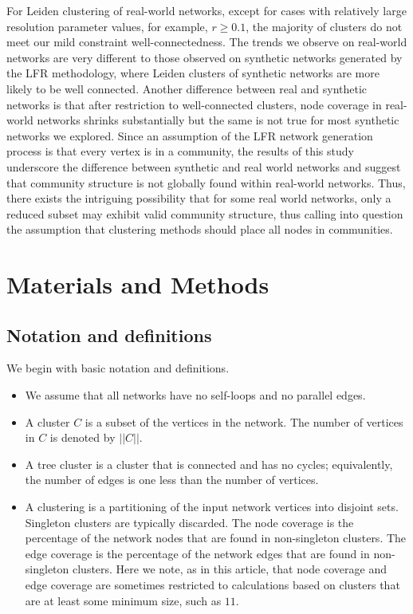 \documentclass[11pt]{article}   	%
\begin{document}
For Leiden clustering of real-world networks, except for cases with relatively large resolution parameter values, for example, $r \geq 0.1$, the majority of clusters do not meet our mild constraint well-connectedness.
The trends we observe on real-world networks are very different to those observed on synthetic networks   generated by the LFR methodology, where Leiden clusters of
synthetic networks are more likely to be well connected. 
Another difference between real and synthetic networks is that after restriction to well-connected clusters, node coverage in real-world networks shrinks substantially but the same is not true for most synthetic networks we explored.  Since an assumption of the LFR network generation process  is that every vertex  is in a community, the results of this study
underscore the difference between synthetic and real world networks and suggest that community structure is not globally found within real-world networks.
Thus, there exists the intriguing possibility that for some  real world networks, only a reduced subset may exhibit valid community structure,
thus calling into question the assumption that  clustering methods should place all nodes in communities.


\section{Materials and Methods}

\subsection{Notation and definitions}
We begin with basic notation and definitions.
\begin{itemize}
\item We assume that all networks have no self-loops and no parallel edges.
\item A cluster $C$ is a subset of the vertices in the network. The number of vertices in $C$ is denoted by $||C||$.
\item A tree cluster is a  cluster that is connected and has no cycles; equivalently, the number of edges is one less than the number of vertices.
\item A clustering is a partitioning of the input network vertices into disjoint sets.  Singleton clusters are typically
discarded.  The node coverage is the percentage of the network nodes that are found in non-singleton clusters.
The edge coverage is the percentage of the network edges that are found in non-singleton clusters. Here we note, as in this article, that 
node coverage and edge coverage are sometimes restricted to calculations based on clusters that are at least some minimum size, such as $11$.
\end{itemize}
\end{document}
